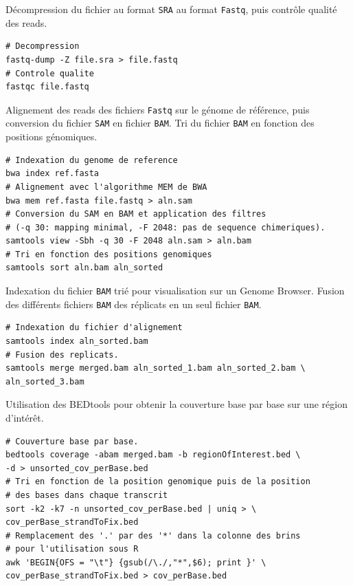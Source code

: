 \documentclass[12pt,a4paper]{report}
\begin{document}
%


\appendix

\chapter{}
\label{annexeCode}

Décompression du fichier au format \texttt{SRA} au format \texttt{Fastq}, puis contrôle qualité des reads.
\begin{lstlisting}[frame=single]
# Decompression
fastq-dump -Z file.sra > file.fastq
# Controle qualite
fastqc file.fastq
\end{lstlisting}

Alignement des reads des fichiers \texttt{Fastq} sur le génome de référence, puis conversion du fichier \texttt{SAM} en fichier \texttt{BAM}. Tri du fichier \texttt{BAM} en fonction des positions génomiques. 
\begin{lstlisting}[frame=single]
# Indexation du genome de reference
bwa index ref.fasta
# Alignement avec l'algorithme MEM de BWA
bwa mem ref.fasta file.fastq > aln.sam
# Conversion du SAM en BAM et application des filtres
# (-q 30: mapping minimal, -F 2048: pas de sequence chimeriques).
samtools view -Sbh -q 30 -F 2048 aln.sam > aln.bam
# Tri en fonction des positions genomiques
samtools sort aln.bam aln_sorted
\end{lstlisting}

Indexation du fichier \texttt{BAM} trié pour visualisation sur un Genome Browser. Fusion des différents fichiers \texttt{BAM} des réplicats en un seul fichier \texttt{BAM}.
\begin{lstlisting}[frame=single]
# Indexation du fichier d'alignement
samtools index aln_sorted.bam
# Fusion des replicats.
samtools merge merged.bam aln_sorted_1.bam aln_sorted_2.bam \
aln_sorted_3.bam
\end{lstlisting}

Utilisation des BEDtools pour obtenir la couverture base par base sur une région d'intérêt.
\lstset{language=sh, commentstyle=\color{ForestGreen}}  
\begin{lstlisting}[frame=single]
# Couverture base par base.
bedtools coverage -abam merged.bam -b regionOfInterest.bed \
-d > unsorted_cov_perBase.bed
# Tri en fonction de la position genomique puis de la position 
# des bases dans chaque transcrit
sort -k2 -k7 -n unsorted_cov_perBase.bed | uniq > \
cov_perBase_strandToFix.bed
# Remplacement des '.' par des '*' dans la colonne des brins 
# pour l'utilisation sous R
awk 'BEGIN{OFS = "\t"} {gsub(/\./,"*",$6); print }' \
cov_perBase_strandToFix.bed > cov_perBase.bed
\end{lstlisting}
\end{document}
